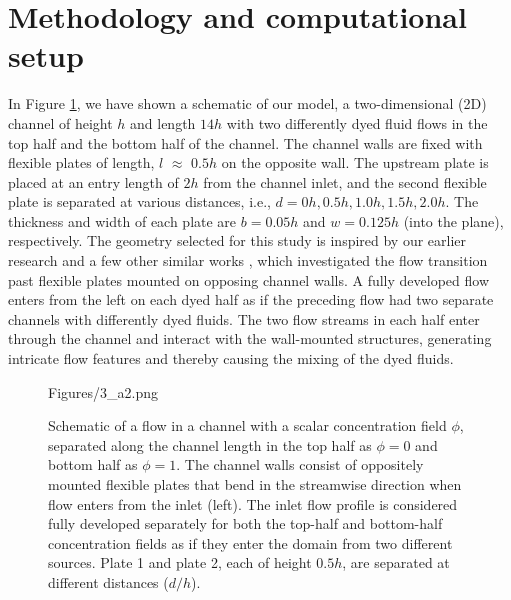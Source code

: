 \documentclass[reprint,a4paper,fleqn]{cas-dc} %
\begin{document}
	\section{Methodology and computational setup}\label{sec:maths}
	
	In Figure \ref{fig:schematic}, we have shown a schematic of our model, a two-dimensional (2D) channel of height $h$ and length $14h$ with two differently dyed fluid flows in the top half and the bottom half of the channel. The channel walls are fixed with flexible plates of length, $l$ $\approx$ $0.5h$ on the opposite wall. The upstream plate is placed at an entry length of $2h$ from the channel inlet, and the second flexible plate is separated at various distances, i.e., $d=0h, 0.5h,1.0h,1.5h, 2.0h$. The thickness and width of each plate are $b = 0.05h$ and $w=0.125h$ (into the plane), respectively. The geometry selected for this study is inspired by our earlier research and a few other similar works \cite{Self2019, Jin2018}, which investigated the flow transition past flexible plates mounted on opposing channel walls. A fully developed flow enters from the left on each dyed half as if the preceding flow had two separate channels with differently dyed fluids. The two flow streams in each half enter through the channel and interact with the wall-mounted structures, generating intricate flow features and thereby causing the mixing of the dyed fluids.
			\begin{figure}[pos=b]
		\begin{minipage}[c]{1\linewidth}	
				\begin{overpic}[width=1\linewidth]{Figures/3_a2.png}
				\end{overpic}
			\end{minipage}
			\caption{Schematic of a flow in a channel with a scalar concentration field $\phi$, separated along the channel length in the top half as $\phi=0$ and bottom half as $\phi=1$. The channel walls consist of oppositely mounted flexible plates that bend in the streamwise direction when flow enters from the inlet (left). The inlet flow profile is considered fully developed separately for both the top-half and bottom-half concentration fields as if they enter the domain from two different sources. Plate 1 and plate 2, each of height $0.5h$, are separated at different distances ($d/h$).}
			\label{fig:schematic}
		\end{figure}\vspace{0cm}
\end{document}
